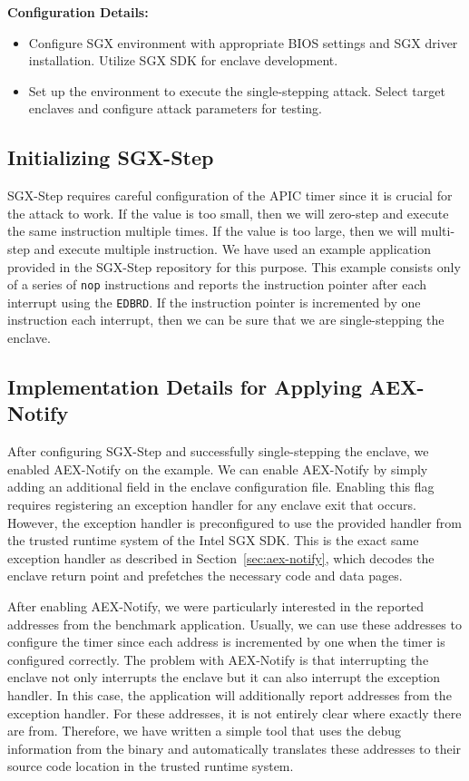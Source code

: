 \documentclass{llncs}
\begin{document}
\textbf{Configuration Details:}
\begin{itemize}
  \item
    Configure SGX environment with appropriate BIOS settings and SGX driver installation.
    Utilize SGX SDK for enclave development.
  \item
    Set up the environment to execute the single-stepping attack.
    Select target enclaves and configure attack parameters for testing.
\end{itemize}

\subsection{Initializing SGX-Step}


SGX-Step requires careful configuration of the APIC timer
since it is crucial for the attack to work.
If the value is too small, then we will zero-step and execute the same instruction multiple times.
If the value is too large, then we will multi-step and execute multiple instruction.
We have used an example application provided in the SGX-Step repository for this purpose.
This example consists only of a series of \texttt{nop} instructions and
reports the instruction pointer after each interrupt using the \texttt{EDBRD}.
If the instruction pointer is incremented by one instruction each interrupt,
then we can be sure that we are single-stepping the enclave.

\subsection{Implementation Details for Applying AEX-Notify}

After configuring SGX-Step and successfully single-stepping the enclave, we enabled AEX-Notify on the example.
We can enable AEX-Notify by simply adding an additional field in the enclave configuration file.
Enabling this flag requires registering an exception handler for any enclave exit that occurs.
However, the exception handler is preconfigured to use the provided handler
from the trusted runtime system of the Intel SGX SDK.
This is the exact same exception handler as described in Section~\ref{sec:aex-notify},
which decodes the enclave return point and prefetches the necessary code and data pages.

After enabling AEX-Notify, we were particularly interested in the reported addresses from the benchmark application.
Usually, we can use these addresses to configure the timer
since each address is incremented by one when the timer is configured correctly.
The problem with AEX-Notify is that interrupting the enclave not only
interrupts the enclave but it can also interrupt the exception handler.
In this case, the application will additionally report addresses from the exception handler.
For these addresses, it is not entirely clear where exactly there are from.
Therefore, we have written a simple tool that uses the debug information from the binary and
automatically translates these addresses to their source code location in the trusted runtime system.
\end{document}
